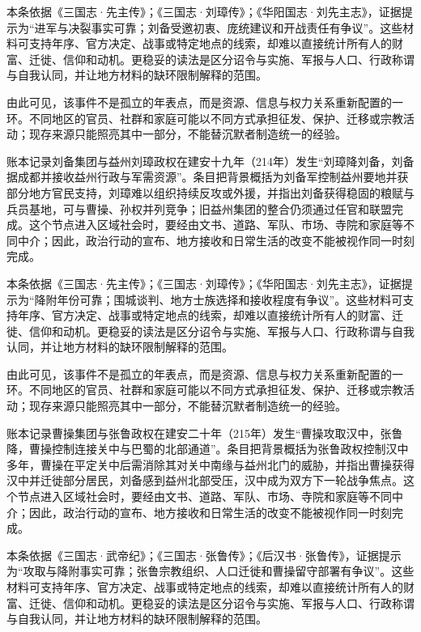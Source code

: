 本条依据《三国志·先主传》；《三国志·刘璋传》；《华阳国志·刘先主志》，证据提示为“进军与决裂事实可靠；刘备受邀初衷、庞统建议和开战责任有争议”。这些材料可支持年序、官方决定、战事或特定地点的线索，却难以直接统计所有人的财富、迁徙、信仰和动机。更稳妥的读法是区分诏令与实施、军报与人口、行政称谓与自我认同，并让地方材料的缺环限制解释的范围。

由此可见，该事件不是孤立的年表点，而是资源、信息与权力关系重新配置的一环。不同地区的官员、社群和家庭可能以不同方式承担征发、保护、迁移或宗教活动；现存来源只能照亮其中一部分，不能替沉默者制造统一的经验。

账本记录刘备集团与益州刘璋政权在建安十九年（214年）发生“刘璋降刘备，刘备据成都并接收益州行政与军需资源”。条目把背景概括为刘备军控制益州要地并获部分地方官民支持，刘璋难以组织持续反攻或外援，并指出刘备获得稳固的粮赋与兵员基地，可与曹操、孙权并列竞争；旧益州集团的整合仍须通过任官和联盟完成。这个节点进入区域社会时，要经由文书、道路、军队、市场、寺院和家庭等不同中介；因此，政治行动的宣布、地方接收和日常生活的改变不能被视作同一时刻完成。

本条依据《三国志·先主传》；《三国志·刘璋传》；《华阳国志·刘先主志》，证据提示为“降附年份可靠；围城谈判、地方士族选择和接收程度有争议”。这些材料可支持年序、官方决定、战事或特定地点的线索，却难以直接统计所有人的财富、迁徙、信仰和动机。更稳妥的读法是区分诏令与实施、军报与人口、行政称谓与自我认同，并让地方材料的缺环限制解释的范围。

由此可见，该事件不是孤立的年表点，而是资源、信息与权力关系重新配置的一环。不同地区的官员、社群和家庭可能以不同方式承担征发、保护、迁移或宗教活动；现存来源只能照亮其中一部分，不能替沉默者制造统一的经验。

账本记录曹操集团与张鲁政权在建安二十年（215年）发生“曹操攻取汉中，张鲁降，曹操控制连接关中与巴蜀的北部通道”。条目把背景概括为张鲁政权控制汉中多年，曹操在平定关中后需消除其对关中南缘与益州北门的威胁，并指出曹操获得汉中并迁徙部分居民，刘备感到益州北部受压，汉中成为双方下一轮战争焦点。这个节点进入区域社会时，要经由文书、道路、军队、市场、寺院和家庭等不同中介；因此，政治行动的宣布、地方接收和日常生活的改变不能被视作同一时刻完成。

本条依据《三国志·武帝纪》；《三国志·张鲁传》；《后汉书·张鲁传》，证据提示为“攻取与降附事实可靠；张鲁宗教组织、人口迁徙和曹操留守部署有争议”。这些材料可支持年序、官方决定、战事或特定地点的线索，却难以直接统计所有人的财富、迁徙、信仰和动机。更稳妥的读法是区分诏令与实施、军报与人口、行政称谓与自我认同，并让地方材料的缺环限制解释的范围。

